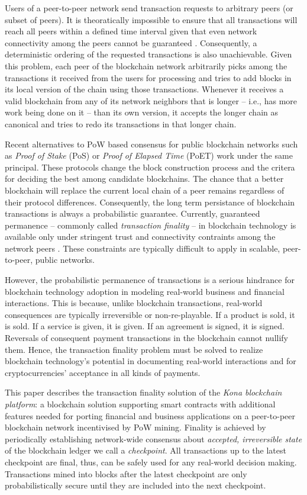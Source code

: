 Users of a peer-to-peer network send transaction requests to arbitrary peers (or subset of peers). It is theoratically impossible to ensure that all transactions will reach all peers within a defined time interval given that even network connectivity among the peers cannot be guaranteed \cite{Fischer1983TheCP}. Consequently, a deterministic ordering of the requested transactions is also unachievable. Given this problem, each peer of the blockchain network arbitrarily picks among the transactions it received from the users for processing  and tries to add blocks in its local version of the chain using those transactions. Whenever it receives a valid blockchain from any of its network neighbors that is longer -- i.e., has more work being done on it -- than its own version, it accepts the longer chain as canonical and tries to redo its transactions in that longer chain. 

Recent alternatives to PoW based consensus for public blockchain networks such as \textit{Proof of Stake} (PoS) \cite{casper} or \textit{Proof of Elapsed Time} (PoET) \cite{poet} work under the same principal. These protocols change the block construction process and the critera for deciding the best among candidate blockchains. The chance that a better blockchain will replace the current local chain of a peer remains regardless of their protocol differences. Consequently, the long term persistance of blockchain transactions is always a probabilistic guarantee. Currently, guaranteed permanence -- commonly called \textit{transaction finality} -- in blockchain technology is available only under stringent trust and connectivity contraints among the network peers \cite{David2014TheRP, thestellar}. These constraints are typically difficult to apply in scalable, peer-to-peer, public networks.   

However, the probabilistic permanence of transactions is a serious hindrance for blockchain technology adoption in modeling real-world business and financial interactions. This is because, unlike blockchain transactions, real-world consequences are typically irreversible or non-re-playable. If a product is sold, it is sold. If a service is given, it is given. If an agreement is signed, it is signed. Reversals of consequent payment transactions in the blockchain cannot nullify them. Hence, the transaction finality problem must be solved to realize blockchain technology's potential in documenting real-world interactions and for cryptocurrencies' acceptance in all kinds of payments.

This paper describes the transaction finality solution of the \textit{Kona blockchain platform}: a blockchain solution supporting smart contracts with additional features needed for porting financial and business applications on a peer-to-peer blockchain network incentivised by PoW mining. Finality is achieved by periodically establishing network-wide consensus about \textit{accepted, irreversible state} of the blockchain ledger we call a \textit{checkpoint}. All transactions up to the latest checkpoint are final, thus, can be safely used for any real-world decision making. Transactions mined into blocks after the latest checkpoint are only probabilistically secure until they are included into the next checkpoint. 

